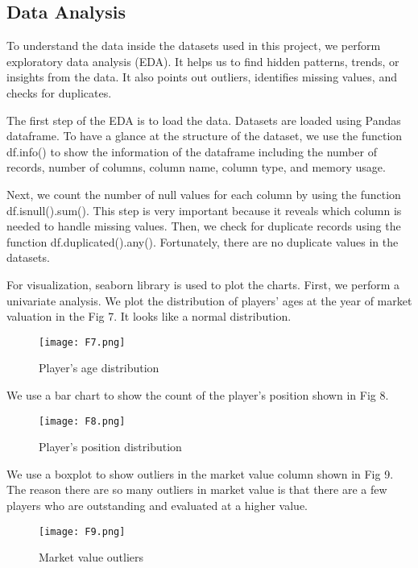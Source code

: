 \documentclass[conference]{IEEEtran}
\begin{document}
\subsection{Data Analysis}
To understand the data inside the datasets used in this project, we perform exploratory data analysis (EDA). It helps us to find hidden patterns, trends, or insights from the data. It also points out outliers, identifies missing values, and checks for duplicates. \par
The first step of the EDA is to load the data. Datasets are loaded using Pandas dataframe. To have a glance at the structure of the dataset, we use the function df.info() to show the information of the dataframe including the number of records, number of columns, column name, column type, and memory usage.\par
Next, we count the number of null values for each column by using the function df.isnull().sum(). This step is very important because it reveals which column is needed to handle missing values. Then, we check for duplicate records using the function df.duplicated().any(). Fortunately, there are no duplicate values in the datasets. \par
For visualization, seaborn library is used to plot the charts. First, we perform a univariate analysis. We plot the distribution of players’ ages at the year of market valuation in the Fig 7. It looks like a normal distribution.


\begin{figure}[ht]
\begin{center}
\centerline{\texttt{[image: F7.png]}}
\caption{Player’s age distribution}
\label{bayespic}
\end{center}
\end{figure}

We use a bar chart to show the count of the player's position shown in Fig 8.

\begin{figure}[ht]
\begin{center}
\centerline{\texttt{[image: F8.png]}}
\caption{Player’s position distribution}
\label{bayespic}
\end{center}
\end{figure}

We use a boxplot to show outliers in the market value column shown in Fig 9. The reason there are so many outliers in market value is that there are a few players who are outstanding and evaluated at a higher value.
\begin{figure}[ht]
\begin{center}
\centerline{\texttt{[image: F9.png]}}
\caption{Market value outliers}
\label{bayespic}
\end{center}
\end{figure}
\end{document}
